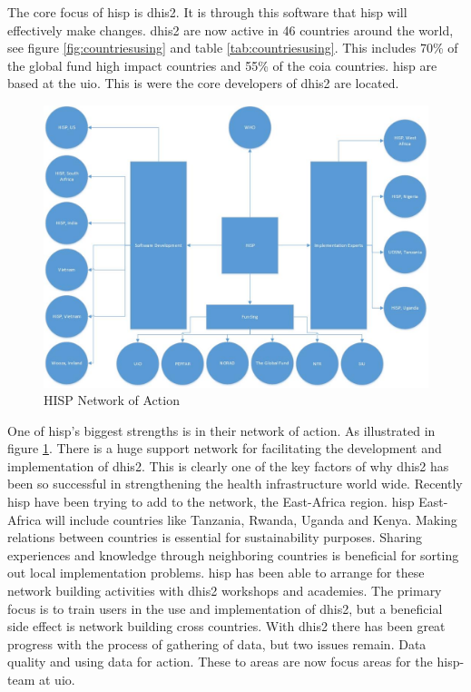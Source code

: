The core focus of \gls{hisp} is \gls{dhis2}. 
It is through this software that \gls{hisp} will effectively make changes. 
\gls{dhis2} are now active in 46 countries around the world, see figure \ref{fig:countriesusing} and table \ref{tab:countriesusing}. 
This includes 70\% of the global fund high impact countries and 55\% of the \gls{coia} countries.
\gls{hisp} are based at the \gls{uio}. This is were the core developers of \gls{dhis2} are located. 

\begin{figure}
\centering
\includegraphics[width=\textwidth]{context/img/networkOfAction}
\caption{HISP Network of Action}
\label{fig:hispnet}
\end{figure}

One of \gls{hisp}'s biggest strengths is in their network of action. 
As illustrated in figure \ref{fig:hispnet}. 
There is a huge support network for facilitating the development and implementation of \gls{dhis2}.
This is clearly one of the key factors of why \gls{dhis2} has been so successful in strengthening the health infrastructure world wide.
Recently \gls{hisp} have been trying to add to the network, the East-Africa region. 
\gls{hisp} East-Africa will include countries like Tanzania, Rwanda, Uganda and Kenya. 
Making relations between countries is essential for sustainability purposes. 
Sharing experiences and knowledge through neighboring countries is beneficial for sorting out local implementation problems. 
\gls{hisp} has been able to arrange for these network building activities with \gls{dhis2} workshops and academies. 
The primary focus is to train users in the use and implementation of \gls{dhis2}, but a beneficial side effect is network building cross countries. 
With \gls{dhis2} there has been great progress with the process of gathering of data, but two issues remain. Data quality and using data for action. 
These to areas are now focus areas for the \gls{hisp}-team at \gls{uio}.

